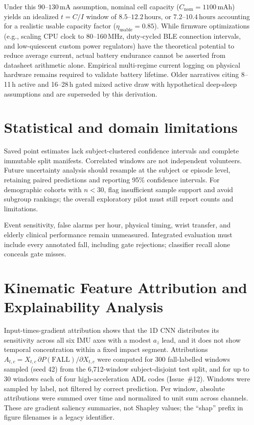 Under this $90\text{--}130\,\mathrm{mA}$ assumption, nominal cell capacity ($C_{\mathrm{nom}} = 1100\,\mathrm{mAh}$) yields an idealized $t = C/I$ window of $8.5\text{--}12.2\,\mathrm{hours}$, or $7.2\text{--}10.4\,\mathrm{hours}$ accounting for a realistic usable capacity factor ($\eta_{\mathrm{usable}} = 0.85$). While firmware optimizations (e.g., scaling CPU clock to 80--160\,MHz, duty-cycled BLE connection intervals, and low-quiescent custom power regulators) have the theoretical potential to reduce average current, actual battery endurance cannot be asserted from datasheet arithmetic alone. Empirical multi-regime current logging on physical hardware remains required to validate battery lifetime. Older narratives citing 8--11\,h active and 16--28\,h gated mixed active draw with hypothetical deep-sleep assumptions and are superseded by this derivation.

\section{Statistical and domain limitations}
Saved point estimates lack subject-clustered confidence intervals and complete immutable split manifests. Correlated windows are not independent volunteers. Future uncertainty analysis should resample at the subject or episode level, retaining paired predictions and reporting 95\% confidence intervals. For demographic cohorts with $n<30$, flag insufficient sample support and avoid subgroup rankings; the overall exploratory pilot must still report counts and limitations.

Event sensitivity, false alarms per hour, physical timing, wrist transfer, and elderly clinical performance remain unmeasured. Integrated evaluation must include every annotated fall, including gate rejections; classifier recall alone conceals gate misses.

\section{Kinematic Feature Attribution and Explainability Analysis}
Input-times-gradient attribution shows that the 1D CNN distributes its sensitivity across all six IMU axes with a modest $a_z$ lead, and it does not show temporal concentration within a fixed impact segment. Attributions $A_{t,c} = X_{t,c}\,\partial P(\mathrm{FALL})/\partial X_{t,c}$ were computed for 300 fall-labelled windows sampled (seed 42) from the 6{,}712-window subject-disjoint test split, and for up to 30 windows each of four high-acceleration ADL codes (Issue~\#12). Windows were sampled by label, not filtered by correct prediction. Per window, absolute attributions were summed over time and normalized to unit sum across channels. These are gradient saliency summaries, not Shapley values; the ``shap'' prefix in figure filenames is a legacy identifier.

